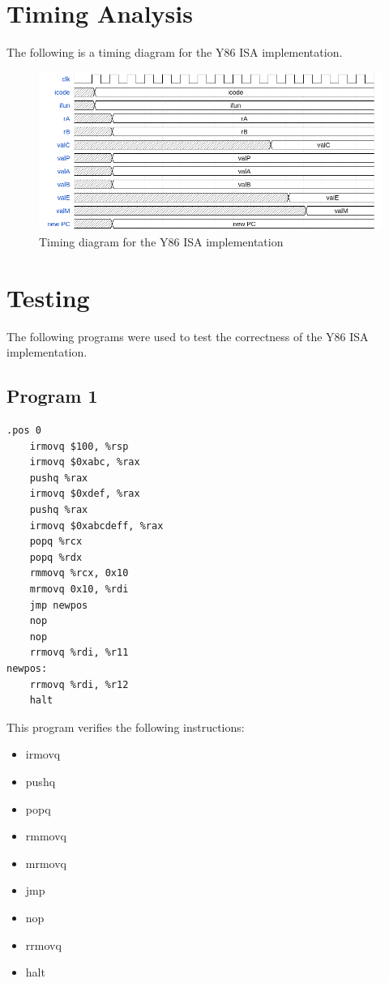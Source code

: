 \documentclass{article}
\begin{document}
\section{Timing Analysis}

The following is a timing diagram for the Y86 ISA implementation.

\begin{figure}[H]
    \centering
    \includegraphics[width=\textwidth]{./images/wavedrom.png}
    \caption{Timing diagram for the Y86 ISA implementation}
\end{figure}

\section{Testing}

The following programs were used to test the correctness of the Y86 ISA implementation.

\subsection{Program 1}

\begin{lstlisting}[language=myassembly]
    .pos 0
    irmovq $100, %rsp
    irmovq $0xabc, %rax
    pushq %rax
    irmovq $0xdef, %rax
    pushq %rax
    irmovq $0xabcdeff, %rax
    popq %rcx
    popq %rdx
    rmmovq %rcx, 0x10
    mrmovq 0x10, %rdi
    jmp newpos
    nop
    nop
    rrmovq %rdi, %r11
newpos:
    rrmovq %rdi, %r12
    halt
\end{lstlisting}

This program verifies the following instructions:
\begin{itemize}
    \item irmovq
    \item pushq
    \item popq
    \item rmmovq
    \item mrmovq
    \item jmp
    \item nop
    \item rrmovq
    \item halt
\end{itemize}
\end{document}
